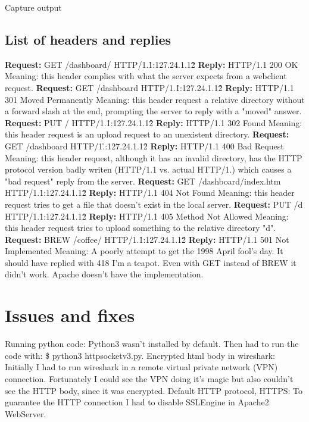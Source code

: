 \documentclass[11pt,a4paper]{report}
\begin{document}
        Capture output

    \subsection{List of headers and replies}
            \textbf{Request:} GET /dashboard/ HTTP/1.1\r\nHost:127.24.1.12\r\n\r\n
            \textbf{Reply:} HTTP/1.1 200 OK
                Meaning: this header complies with what the server expects from a webclient request.
            \textbf{Request:} GET /dashboard HTTP/1.1\r\nHost:127.24.1.12\r\n\r\n
            \textbf{Reply:} HTTP/1.1 301 Moved Permanently
                Meaning: this header request a relative directory without a forward slash at the end, prompting the server to reply with a "moved" answer.
            \textbf{Request:} PUT / HTTP/1.1\r\nHost:127.24.1.12\r\n\r\n
            \textbf{Reply:} HTTP/1.1 302 Found
                Meaning: this header request is an upload request to an unexistent directory.
            \textbf{Request:} GET /dashboard HTTP/1.\r\nHost:127.24.1.12\r\n\r\n
            \textbf{Reply:} HTTP/1.1 400 Bad Request
                Meaning: this header request, although it has an invalid directory, has the HTTP protocol version badly writen (HTTP/1.1 vs. actual HTTP/1.) which causes
                a "bad request" reply from the server.
            \textbf{Request:} GET /dashboard/index.htm HTTP/1.1\r\nHost:127.24.1.12\r\n\r\n
            \textbf{Reply:} HTTP/1.1 404 Not Found
                Meaning: this header request tries to get a file that doesn't exist in the local server.
            \textbf{Request:} PUT /d HTTP/1.1\r\nHost:127.24.1.12\r\n\r\n
            \textbf{Reply:} HTTP/1.1 405 Method Not Allowed
                Meaning: this header request tries to upload something to the relative directory "d".
            \textbf{Request:} BREW /coffee/ HTTP/1.1\r\nHost:127.24.1.12\r\n\r\n
            \textbf{Reply:} HTTP/1.1 501 Not Implemented
                Meaning: A poorly attempt to get the 1998 April fool's day. It should have replied with 418 I'm a teapot. Even with GET instead of BREW it didn't work.
                Apache doesn't have the implementation. 

\section{Issues and fixes}
    Running python code:
        Python3 wasn't installed by default. Then had to run the code with: \$ python3 httpsocketv3.py.
    Encrypted html body in wireshark:
        Initially I had to run wireshark in a remote virtual private network (VPN) connection. Fortunately I could see the VPN doing it's magic but also couldn't see the HTTP body, since it was encrypted.
    Default HTTP protocol, HTTPS:
        To guarantee the HTTP connection I had to disable SSLEngine in Apache2 WebServer.
\end{document}
